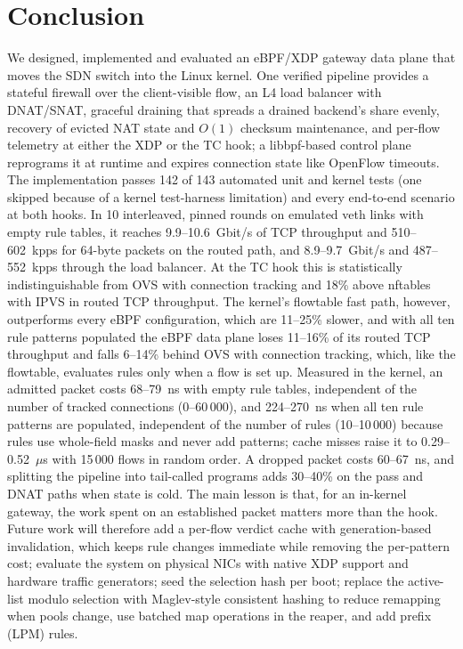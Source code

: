 \documentclass[conference]{IEEEtran}
\begin{document}
\section{Conclusion}
We designed, implemented and evaluated an eBPF/XDP gateway data plane that
moves the SDN switch into the Linux kernel. One verified pipeline provides a
stateful firewall over the client-visible flow, an L4 load balancer with
DNAT/SNAT, graceful draining that spreads a drained backend's share evenly,
recovery of evicted NAT state and $O(1)$ checksum maintenance, and per-flow
telemetry at either the XDP or the TC hook; a libbpf-based control plane
reprograms it at runtime and expires connection state like OpenFlow
timeouts. The implementation passes 142 of 143 automated unit and kernel
tests (one skipped because of a kernel test-harness limitation) and every
end-to-end scenario at both hooks. In 10 interleaved, pinned rounds on
emulated veth links with empty rule tables, it reaches 9.9--10.6~Gbit/s of
TCP throughput and 510--602~kpps for 64-byte packets on the routed path, and
8.9--9.7~Gbit/s and 487--552~kpps through the load balancer. At the TC hook
this is statistically indistinguishable from OVS with connection tracking
and 18\% above nftables with IPVS in routed TCP throughput. The kernel's
flowtable fast path, however, outperforms every eBPF configuration, which
are 11--25\% slower, and with all ten rule patterns populated the eBPF data plane
loses 11--16\% of its routed TCP throughput and falls 6--14\% behind OVS with
connection tracking, which, like the flowtable, evaluates rules only when a
flow is set up. Measured in the kernel, an admitted packet costs 68--79~ns
with empty rule tables, independent of the number of tracked connections
(0--60\,000), and 224--270~ns when all ten rule patterns are populated,
independent of the number of rules (10--10\,000) because rules use
whole-field masks and never add patterns; cache misses raise it to
0.29--0.52~$\mu$s with
15\,000 flows in random order. A dropped packet costs 60--67~ns, and
splitting the pipeline into tail-called programs adds 30--40\% on the pass
and DNAT paths when state is cold. The main lesson is that, for an in-kernel
gateway, the work spent on an established packet matters more than the hook.
Future work will therefore add a per-flow verdict cache with generation-based
invalidation, which keeps rule changes immediate while removing the
per-pattern cost; evaluate the system on physical NICs with native XDP support
and hardware traffic generators; seed the selection hash per boot; replace
the active-list modulo selection with Maglev-style
consistent hashing \cite{eisenbud2016maglev} to reduce remapping when pools
change, use batched map operations in the reaper, and add prefix (LPM) rules.
\end{document}
